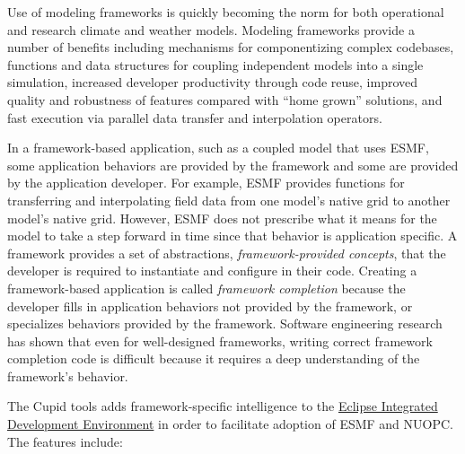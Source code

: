 \documentclass[oneside,11pt]{memoir}
\begin{document}
Use of modeling frameworks is quickly becoming the norm for both operational and research climate and weather models. Modeling frameworks provide a number of benefits including mechanisms for componentizing complex codebases, functions and data structures for coupling independent models into a single simulation, increased developer productivity through code reuse, improved quality and robustness of features compared with ``home grown'' solutions, and fast execution via parallel data transfer and interpolation operators. 

In a framework-based application, such as a coupled model that uses ESMF, some application behaviors are provided by the framework and some are provided by the application developer. For example, ESMF provides functions for transferring and interpolating field data from one model's native grid to another model's native grid. However, ESMF does not prescribe what it means for the model to take a step forward in time since that behavior is application specific. A framework provides a set of abstractions, \emph{framework-provided concepts}, that the developer is required to instantiate and configure in their code. Creating a framework-based application is called \emph{framework completion} because the developer fills in application behaviors not provided by the framework, or specializes  behaviors provided by the framework. Software engineering research has shown that even for well-designed frameworks, writing correct framework completion code is difficult because it requires a deep understanding of the framework's behavior.

The Cupid tools adds framework-specific intelligence to the \href{https://www.eclipse.org/}{Eclipse Integrated Development Environment} in order to facilitate adoption of ESMF and NUOPC. The features include:
\end{document}
